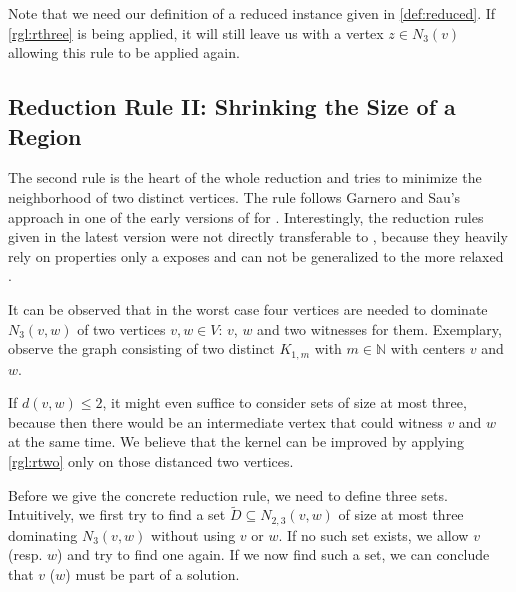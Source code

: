 Note that we need our definition of a reduced instance given in \ref{def:reduced}. If \cref{rgl:rthree} is being applied, it will still leave us with a vertex $z\in N_3(v)$ allowing this rule to be applied again.

\subsection{Reduction Rule II: Shrinking the Size of a Region}

The second rule is the heart of the whole reduction and tries to minimize the neighborhood of two distinct vertices. The rule follows Garnero and Sau's approach in one of the early versions of \cite{Garnero2014} for \ptdom. Interestingly, the reduction rules given in the latest version were not directly transferable to \psdom, because they heavily rely on properties only a \ptdom exposes and can not be generalized to the more relaxed \psdom.





It can be observed that in the worst case four vertices are needed to dominate $N_3(v,w)$ of two vertices $v,w \in V$: $v$, $w$ and two witnesses for them. Exemplary, observe the graph consisting of two distinct $K_{1,m}$ with $m \in \mathbb{N}$ with centers $v$ and $w$.

If $d(v,w) \leq 2$, it might even suffice to consider sets of size at most three, because then there would be an intermediate vertex that could witness $v$ and $w$ at the same time. We believe that the kernel can be improved by applying \cref{rgl:rtwo} only on those distanced two vertices. 

Before we give the concrete reduction rule, we need to define three sets. Intuitively, we first try to find a set $\tilde D \subseteq N_{2,3}(v,w)$ of size at most three dominating $N_3(v,w)$ without using $v$ or $w$. If no such set exists, we allow $v$ (resp. $w$) and try to find one again. If we now find such a set, we can conclude that $v$ ($w$) must be part of a solution.

